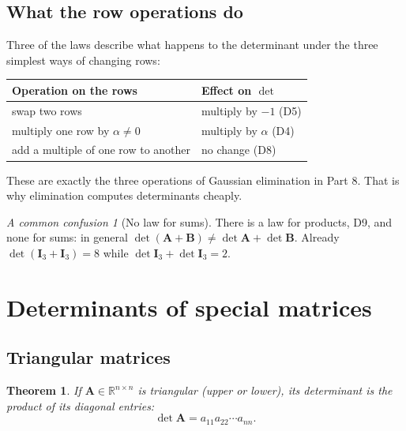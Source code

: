 \documentclass[11pt]{article}
\theoremstyle{plain}
\newtheorem{thm}{Theorem}[section]
\theoremstyle{definition}
\theoremstyle{remark}
\newtheorem*{warn}{A common confusion}
\newcommand{\R}{\mathbb{R}}
\newcommand{\mt}[1]{\mathbf{#1}}
\begin{document}
\subsection{What the row operations do}
Three of the laws describe what happens to the determinant under the three
simplest ways of changing rows:
\begin{center}
\renewcommand{\arraystretch}{1.35}
\begin{tabular}{@{}l l@{}}
\toprule
\textbf{Operation on the rows} & \textbf{Effect on $\det$} \\
\midrule
swap two rows & multiply by $-1$ (D5) \\
multiply one row by $\alpha\neq0$ & multiply by $\alpha$ (D4) \\
add a multiple of one row to another & no change (D8) \\
\bottomrule
\end{tabular}
\end{center}
These are exactly the three operations of Gaussian elimination in Part 8. That
is why elimination computes determinants cheaply.

\begin{warn}[No law for sums]
There is a law for products, D9, and none for sums: in general
$\det(\mt{A}+\mt{B})\neq\det\mt{A}+\det\mt{B}$. Already
$\det(\mt{I}_3+\mt{I}_3)=8$ while $\det\mt{I}_3+\det\mt{I}_3=2$.
\end{warn}

\section{Determinants of special matrices}

\subsection{Triangular matrices}
\begin{thm}
\label{thm:triangular}
If $\mt{A}\in\R^{n\times n}$ is triangular (upper or lower), its determinant is
the product of its diagonal entries:
\[
  \det\mt{A}=a_{11}a_{22}\cdots a_{nn}.
\]
\end{thm}
\end{document}
